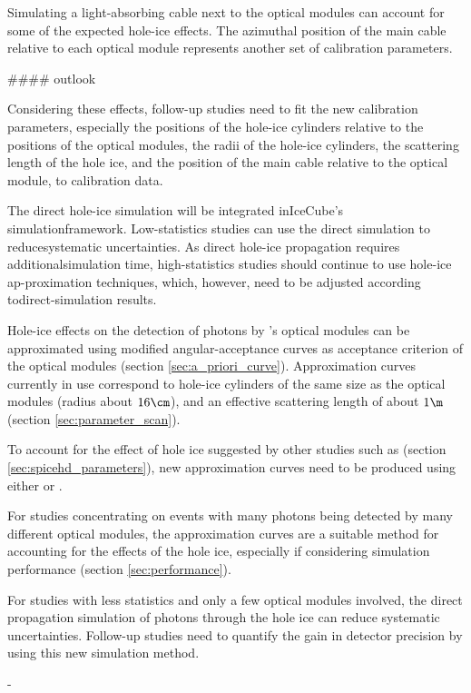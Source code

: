 Simulating a light-absorbing cable next to the optical modules can account for some of the expected hole-ice effects. The azimuthal position of the main cable relative to each optical module represents another set of calibration parameters.

#### outlook

Considering these effects, follow-up studies need to fit the new calibration parameters, especially the positions of the hole-ice cylinders relative to the positions of the optical modules, the radii of the hole-ice cylinders, the scattering length of the hole ice, and the position of the main cable relative to the optical module, to calibration data.

The direct hole-ice simulation will be integrated inIceCube’s simulationframework.  Low-statistics studies can use the direct simulation to reducesystematic uncertainties.  As direct hole-ice propagation requires additionalsimulation time, high-statistics studies should continue to use hole-ice ap-proximation techniques, which, however, need to be adjusted according todirect-simulation results.

Hole-ice effects on the detection of photons by \icecube's optical modules can be approximated using modified angular-acceptance curves as acceptance criterion of the optical modules (section \ref{sec:a_priori_curve}). Approximation curves currently in use correspond to hole-ice cylinders of the same size as the optical modules (radius about $16\cm$), and an effective scattering length of about $1\m$ (section \ref{sec:parameter_scan}).

To account for the effect of hole ice suggested by other studies such as  (section \ref{sec:spicehd_parameters}), new approximation curves need to be produced using either \ppc or \clsim.

For studies concentrating on events with many photons being detected by many different optical modules, the approximation curves are a suitable method for accounting for the effects of the hole ice, especially if considering simulation performance (section \ref{sec:performance}).

For studies with less statistics and only a few optical modules involved, the direct propagation simulation of photons through the hole ice can reduce systematic uncertainties. Follow-up studies need to quantify the gain in detector precision by using this new simulation method.


-